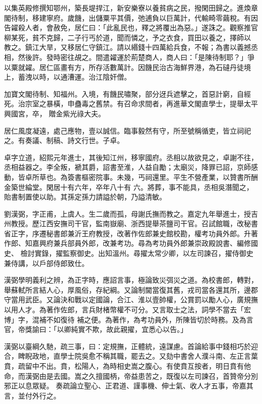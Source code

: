 \begin{pinyinscope}
 以集英殿修撰知鄂州，築長堤捍江，新安樂寮以養貧病之民，撥閑田歸之。進煥章閣待制，移建寧府。歲饑，出儲粟平其價，弛逋負以巨萬計，代輸畸零繭稅。有因告糴殺人者，會赦免，居仁曰：「此亂民也，釋之將覆出為惡。」遂誅之。觀察推官柳某死，貧不克歸，二子行丐於道，聞而憐之，予之衣食，買田以養之，擇師以
 教之。鎮江大旱，又移居仁守鎮江。請以緡錢十四萬給兵食，不報；為書以義撼丞相，然後許。發時密往覘之。間遣糴運於荊楚商人，商人曰：「是陳待制耶？」爭以粟就糴。居仁區畫有方，所存活數萬計。因饑民治古海鮮界港，為石䃮丹徒境上，蓄洩以時，以通漕運。治江陰奸僧。



 加寶文閣待制、知福州。入境，有饑民嘯聚，部分迓兵遮擊之，首惡計窮，自經死。治宗室之暴橫，申蠱毒之舊禁。有召命求間者，再進華文閣直學士，提舉太平興國宮，卒，
 贈金紫光祿大夫。



 居仁風度凝遠，處己應物，壹以誠信。臨事毅然有守，所至號稱循吏，皆立祠祀之。有奏議、制稿、詩文行世。子卓。



 卓字立道，紹熙元年進士，其後知江州，移寧國府。丞相以故欲見之，卓謝不往，丞相益器之。李全叛，褫其爵，詔書至淮，人益自勵；太廟災，降罪已詔，京師感動，皆卓所草也。為簽書樞密院事。未幾，丐祠還里。平生不營產業，以贊書所酬金築世綸堂。閑居十有六年，卒年八十有
 六。將葬，事不能具，丞相吳潛聞之，貽書制置使以助。其孫定孫力請謚於朝，乃謚清敏。



 劉漢弼，字正甫，上虞人。生二歲而孤，母謝氏撫而教之。嘉定九年舉進士，授吉州教授。歷江西安撫司干官，監南嶽廟、浙西提舉茶鹽司干官。召試館職，改秘書省正字，序遷秘書郎兼沂王府教授，改著作佐郎兼史館校勘，權考功員外郎。升著作郎、知嘉興府兼兵部員外郎，改兼考功。尋為考功員外郎兼崇政殿說書、編修國史、
 檢討實錄，擢監察御史。出知溫州。尋擢太常少卿，以左司諫召，擢侍御史兼侍講，以戶部侍郎致仕。



 漢弼學明義利之辨，為正字時，應詔言事，極論致災弭災之道。為校書郎，轉對，舉蘇軾所言結人心，厚風俗，存紀綱。又論制閫當復其舊，戎司當各還其所，邊郡守當用武臣。又論決和戰以定國論，合江、淮以壹帥權，公賞罰以勵人心，廣規撫以用人才。為著作佐郎，言兵財楮幣權不可分。又言取士之法，詞學不當去「宏博」字，混補不如復待
 補之便。為著作，為考功員外，所陳皆切於時務。及為言官，帝獎諭曰：「以卿純實不欺，故此親擢，宜悉心以告。」



 漢弼以臺綱久馳，疏三事，曰：定規撫，正體統，遠謀慮。首論給事中錢相巧於迎合，睥睨政地，直學士院吳愈不稱其職，罷去之。又劾中書舍人濮斗南、左正言葉賁，疏留中不出。賁，松陽人，為時相史嵩之腹心。有使賁互按者，明日賁有他命，而漢弼由是去國。嵩之久擅國柄，帝益患苦之，既復以左司諫召，首贊帝分別邪正以息眾疑。
 奏疏論立聖心、正君道、謹事機、伸士氣、收人才五事，帝嘉其言，並付外行之。




\end{pinyinscope}
